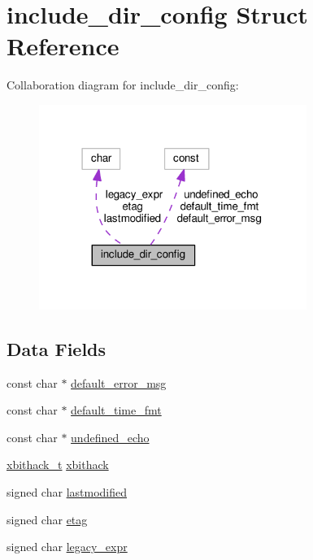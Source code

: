 \hypertarget{structinclude__dir__config}{}\section{include\+\_\+dir\+\_\+config Struct Reference}
\label{structinclude__dir__config}


Collaboration diagram for include\+\_\+dir\+\_\+config\+:
\nopagebreak
\begin{figure}[H]
\begin{center}
\leavevmode
\includegraphics[width=247pt]{structinclude__dir__config__coll__graph}
\end{center}
\end{figure}
\subsection*{Data Fields}
\begin{DoxyCompactItemize}
\item 
const char $\ast$ \hyperlink{structinclude__dir__config_a394bb1e140922d4cce00455fbf9e5acc}{default\+\_\+error\+\_\+msg}
\item 
const char $\ast$ \hyperlink{structinclude__dir__config_a228c6c82df22e57d61526bc9390e0cf0}{default\+\_\+time\+\_\+fmt}
\item 
const char $\ast$ \hyperlink{structinclude__dir__config_a137936d77d5fb28a3f2d053597b861a3}{undefined\+\_\+echo}
\item 
\hyperlink{mod__include_8c_ae7a11eebe65d19cf4969ff548c02762d}{xbithack\+\_\+t} \hyperlink{structinclude__dir__config_ad694e678dbe02df584e69828ce252f11}{xbithack}
\item 
signed char \hyperlink{structinclude__dir__config_aaee754a1a4eace7ac9b0d06654db6682}{lastmodified}
\item 
signed char \hyperlink{structinclude__dir__config_a802e0236a36c70e828971ded554e470a}{etag}
\item 
signed char \hyperlink{structinclude__dir__config_ad6fe740072fa657abe56dae8268e8600}{legacy\+\_\+expr}
\end{DoxyCompactItemize}


